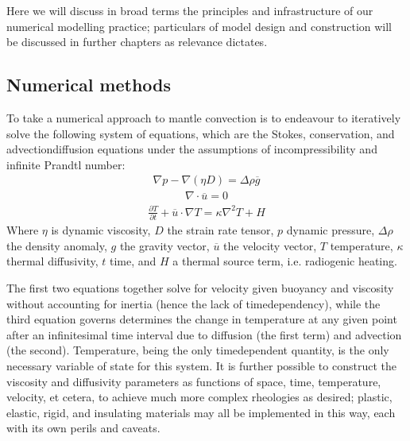 \documentclass[letterpaper,10pt,english]{jupyterBook}
\begin{document}
\sphinxAtStartPar
Here we will discuss in broad terms the principles and infrastructure of our numerical modelling practice; particulars of model design and construction will be discussed in further chapters as relevance dictates.


\subsection{Numerical methods}
\label{\detokenize{content/chapter_02_methods/section2:numerical-methods}}
\sphinxAtStartPar
To take a numerical approach to mantle convection is to endeavour to iteratively solve the following system of equations, which are the Stokes, conservation, and advection\sphinxhyphen{}diffusion equations under the assumptions of incompressibility and infinite Prandtl number:
\begin{equation*}
\begin{split} \nabla p - \nabla \left( \eta D \right) = \Delta \rho \overline{g} \end{split}
\end{equation*}\begin{equation*}
\begin{split} \nabla \cdot \overline{u} = 0 \end{split}
\end{equation*}\begin{equation*}
\begin{split} \frac{\partial T}{\partial t} + \overline{u} \cdot \nabla T = \kappa \nabla^2 T + H \end{split}
\end{equation*}
\sphinxAtStartPar
Where \(\eta\) is dynamic viscosity, \(D\) the strain rate tensor, \(p\) dynamic pressure, \(\Delta\rho\) the density anomaly, \(g\) the gravity vector, \(\overline{u}\) the velocity vector, \(T\) temperature, \(\kappa\) thermal diffusivity, \(t\) time, and \(H\) a thermal source term, i.e. radiogenic heating.

\sphinxAtStartPar
The first two equations together solve for velocity given buoyancy and viscosity without accounting for inertia (hence the lack of time\sphinxhyphen{}dependency), while the third equation governs determines the change in temperature at any given point after an infinitesimal time interval due to diffusion (the first term) and advection (the second). Temperature, being the only time\sphinxhyphen{}dependent quantity, is the only necessary variable of state for this system. It is further possible to construct the viscosity and diffusivity parameters as functions of space, time, temperature, velocity, et cetera, to achieve much more complex rheologies as desired; plastic, elastic, rigid, and insulating materials may all be implemented in this way, each with its own perils and caveats.
\end{document}
